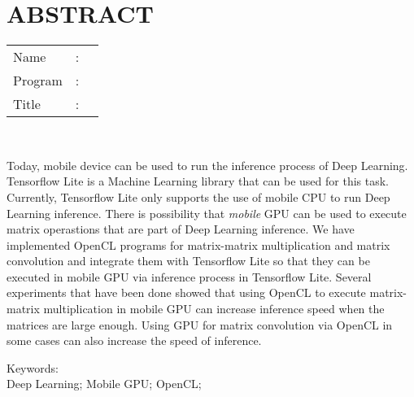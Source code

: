 %
%
%

\chapter*{ABSTRACT}

\vspace*{0.2cm}

\noindent \begin{tabular}{l l p{11.0cm}}
	Name&: & \penulis \\
	Program&: & \programInggris \\
	Title&: & \judulInggris \\
\end{tabular} \\ 

\vspace*{0.5cm}

\noindent 
Today, mobile device can be used to run the inference process of Deep Learning. Tensorflow Lite is a Machine Learning library that can be used for this task. Currently, Tensorflow Lite only supports the use of mobile CPU to run Deep Learning inference. There is possibility that \textit{mobile} GPU can be used to execute matrix operastions that are part of Deep Learning inference. We have implemented OpenCL programs for matrix-matrix multiplication and matrix convolution and integrate them with Tensorflow Lite so that they can be executed in mobile GPU via inference process in Tensorflow Lite. Several experiments that have been done showed that using OpenCL to execute matrix-matrix multiplication in mobile GPU can increase inference speed when the matrices are large enough. Using GPU for matrix convolution via OpenCL in some cases can also increase the speed of inference.
\\

\vspace*{0.2cm}

\noindent Keywords: \\ 
\noindent Deep Learning; Mobile GPU; OpenCL; \\

\newpage